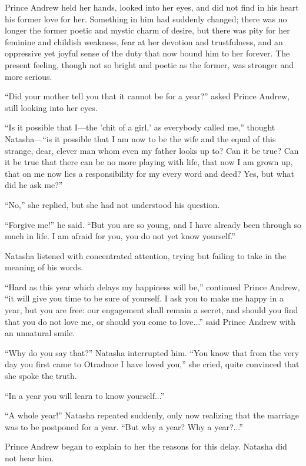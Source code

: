 Prince Andrew held her hands, looked into her eyes, and did not
find in his heart his former love for her. Something in him had
suddenly changed; there was no longer the former poetic and
mystic charm of desire, but there was pity for her feminine and
childish weakness, fear at her devotion and trustfulness, and an
oppressive yet joyful sense of the duty that now bound him to her
forever. The present feeling, though not so bright and poetic as
the former, was stronger and more serious.

``Did your mother tell you that it cannot be for a year?'' asked
Prince Andrew, still looking into her eyes.

``Is it possible that I---the 'chit of a girl,' as everybody
called me,'' thought Natasha---``is it possible that I am now to
be the wife and the equal of this strange, dear, clever man whom
even my father looks up to?  Can it be true? Can it be true that
there can be no more playing with life, that now I am grown up,
that on me now lies a responsibility for my every word and deed?
Yes, but what did he ask me?''

``No,'' she replied, but she had not understood his question.

``Forgive me!'' he said. ``But you are so young, and I have
already been through so much in life. I am afraid for you, you do
not yet know yourself.''

Natasha listened with concentrated attention, trying but failing
to take in the meaning of his words.

``Hard as this year which delays my happiness will be,''
continued Prince Andrew, ``it will give you time to be sure of
yourself. I ask you to make me happy in a year, but you are free:
our engagement shall remain a secret, and should you find that
you do not love me, or should you come to love...'' said Prince
Andrew with an unnatural smile.

``Why do you say that?'' Natasha interrupted him. ``You know that
from the very day you first came to Otradnoe I have loved you,''
she cried, quite convinced that she spoke the truth.

``In a year you will learn to know yourself...''

``A whole year!'' Natasha repeated suddenly, only now realizing
that the marriage was to be postponed for a year. ``But why a
year? Why a year?...''

Prince Andrew began to explain to her the reasons for this delay.
Natasha did not hear him.

